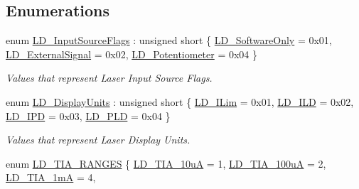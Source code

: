 \subsection*{Enumerations}
\begin{DoxyCompactItemize}
\item 
enum \hyperlink{group___t_cube_laser_diode_ga7c1f74f89008cec3af2479ee2261a266}{L\+D\+\_\+\+Input\+Source\+Flags} \+: unsigned short \{ \hyperlink{group___t_cube_laser_diode_gga7c1f74f89008cec3af2479ee2261a266a061dbcdd38ef206d50c37cdd870c5869}{L\+D\+\_\+\+Software\+Only} = 0x01, 
\hyperlink{group___t_cube_laser_diode_gga7c1f74f89008cec3af2479ee2261a266a40696484a134521428fa950aad395ef4}{L\+D\+\_\+\+External\+Signal} = 0x02, 
\hyperlink{group___t_cube_laser_diode_gga7c1f74f89008cec3af2479ee2261a266abcf50ff46f6e9f49ef55f83113f4b16f}{L\+D\+\_\+\+Potentiometer} = 0x04
 \}\begin{DoxyCompactList}\small\item\em Values that represent Laser Input Source Flags. \end{DoxyCompactList}
\item 
enum \hyperlink{group___t_cube_laser_diode_ga08addc78430e6c04fb1441655e98a67d}{L\+D\+\_\+\+Display\+Units} \+: unsigned short \{ \hyperlink{group___t_cube_laser_diode_gga08addc78430e6c04fb1441655e98a67da9ab3755662842d9bce9ed51db088f908}{L\+D\+\_\+\+I\+Lim} = 0x01, 
\hyperlink{group___t_cube_laser_diode_gga08addc78430e6c04fb1441655e98a67da54eb9d07a6d105dd18e4c7aaa6574ac0}{L\+D\+\_\+\+I\+LD} = 0x02, 
\hyperlink{group___t_cube_laser_diode_gga08addc78430e6c04fb1441655e98a67da1ba88ced74acd116cb5b461be92b8f88}{L\+D\+\_\+\+I\+PD} = 0x03, 
\hyperlink{group___t_cube_laser_diode_gga08addc78430e6c04fb1441655e98a67dac8c33042fe3ffbeb1d7984391a6ffbe0}{L\+D\+\_\+\+P\+LD} = 0x04
 \}\begin{DoxyCompactList}\small\item\em Values that represent Laser Display Units. \end{DoxyCompactList}
\item 
enum \hyperlink{group___t_cube_laser_diode_gafa4a381f77aedb5578f7b24d6d170231}{L\+D\+\_\+\+T\+I\+A\+\_\+\+R\+A\+N\+G\+ES} \{ \hyperlink{group___t_cube_laser_diode_ggafa4a381f77aedb5578f7b24d6d170231a040e4b5c4f085b284d939c88cb4f28cc}{L\+D\+\_\+\+T\+I\+A\+\_\+10uA} = 1, 
\hyperlink{group___t_cube_laser_diode_ggafa4a381f77aedb5578f7b24d6d170231ac8318332868740c713d225e3b77cc048}{L\+D\+\_\+\+T\+I\+A\+\_\+100uA} = 2, 
\hyperlink{group___t_cube_laser_diode_ggafa4a381f77aedb5578f7b24d6d170231ab0225a70aba40ea9ffe82b9dbca4cb4a}{L\+D\+\_\+\+T\+I\+A\+\_\+1mA} = 4, 

\end{DoxyCompactItemize}
